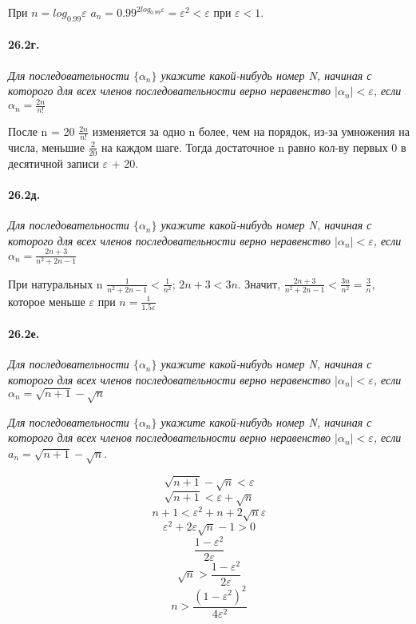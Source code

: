 \documentclass{book}
\begin{document}
При $n = log_{0.99} \varepsilon$ $a_n = 0.99^{2log_{0.99}\varepsilon} = \varepsilon^2 < \varepsilon$ при $\varepsilon < 1$.

\paragraph{26.2г.}
\textit{Для последовательности $\{\alpha_n\}$ укажите какой-нибудь номер N, начиная с которого для всех членов последовательности верно неравенство $|\alpha_n| < \varepsilon$, если $\alpha_n = \frac{2n}{n!}$}

После n = 20 $\frac{2n}{n!} $ изменяется за одно n более, чем на порядок, из-за умножения на числа, меньшие $\frac{2}{20}$ на каждом шаге. Тогда достаточное n равно кол-ву первых 0 в десятичной записи $\varepsilon$ + 20. 

\paragraph{26.2д.}
\textit{Для последовательности $\{\alpha_n\}$ укажите какой-нибудь номер N, начиная с которого для всех членов последовательности верно неравенство $|\alpha_n| < \varepsilon$, если $\alpha_n = \frac{2n + 3}{n^2 + 2n - 1}$}

При натуральных n $\frac{1}{n^2+2n-1} < \frac{1}{n^2}$; $2n + 3 < 3n$. Значит, $\frac{2n+3}{n^2+2n-1} < \frac{3n}{n^2} = \frac{3}{n}$, которое меньше $\varepsilon$ при $n = \frac{1}{1.5 \varepsilon}$
\newpage

\paragraph{26.2е.}
\textit{Для последовательности $\{\alpha_n\}$ укажите какой-нибудь номер N, начиная с которого для всех членов последовательности верно неравенство $|\alpha_n| < \varepsilon$, если $\alpha_n = \sqrt{n + 1} - \sqrt{n}$}

\textit{Для последовательности $\{\alpha_n\}$ укажите какой-нибудь номер N, начиная с которого для всех членов последовательности верно неравенство $|\alpha_n| < \varepsilon$, если $a_n = \sqrt{n+1} - \sqrt{n}$}.

\[\sqrt{n+1} - \sqrt{n} < \varepsilon\]
\[\sqrt{n+1} < \varepsilon + \sqrt{n}\]
\[n+1 < \varepsilon^2 + n + 2\sqrt{n}\varepsilon\]
\[\varepsilon^2 + 2 \varepsilon \sqrt{n} - 1 > 0\]
\[\frac{1 - \varepsilon^2}{2 \varepsilon}\]
\[\sqrt{n} > \frac{1 - \varepsilon^2}{2 \varepsilon}\]
\[n > \frac{(1 - \varepsilon^2)^2}{{4\varepsilon^2}} \]
\end{document}
